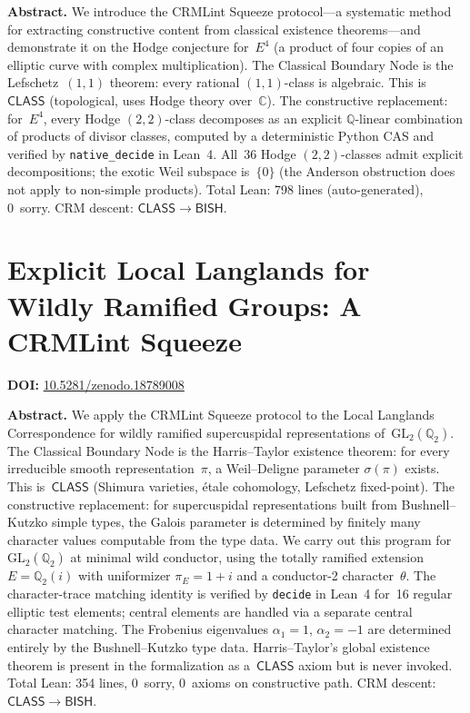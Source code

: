 \documentclass[11pt,a4paper]{article}
\begin{document}
\bigskip
\noindent\textbf{Abstract.}
We introduce the CRMLint Squeeze protocol---a systematic method for extracting constructive content from classical existence theorems---and demonstrate it on the Hodge conjecture for~$E^4$ (a product of four copies of an elliptic curve with complex multiplication). The Classical Boundary Node is the Lefschetz~$(1,1)$ theorem: every rational $(1,1)$-class is algebraic. This is~$\mathsf{CLASS}$ (topological, uses Hodge theory over~$\mathbb{C}$). The constructive replacement: for~$E^4$, every Hodge $(2,2)$-class decomposes as an explicit $\mathbb{Q}$-linear combination of products of divisor classes, computed by a deterministic Python CAS and verified by \texttt{native\_decide} in Lean~4. All~36 Hodge $(2,2)$-classes admit explicit decompositions; the exotic Weil subspace is~$\{0\}$ (the Anderson obstruction does not apply to non-simple products). Total Lean: 798 lines (auto-generated), 0~sorry. CRM descent: $\mathsf{CLASS} \to \mathsf{BISH}$.

\section{Explicit Local Langlands for Wildly Ramified Groups: A CRMLint Squeeze}
\label{sec:p78}
\textbf{DOI:} \href{https://doi.org/10.5281/zenodo.18789008}{10.5281/zenodo.18789008}

\bigskip
\noindent\textbf{Abstract.}
We apply the CRMLint Squeeze protocol to the Local Langlands Correspondence for wildly ramified supercuspidal representations of~$\mathrm{GL}_2(\mathbb{Q}_2)$. The Classical Boundary Node is the Harris--Taylor existence theorem: for every irreducible smooth representation~$\pi$, a Weil--Deligne parameter $\sigma(\pi)$ exists. This is~$\mathsf{CLASS}$ (Shimura varieties, \'etale cohomology, Lefschetz fixed-point). The constructive replacement: for supercuspidal representations built from Bushnell--Kutzko simple types, the Galois parameter is determined by finitely many character values computable from the type data. We carry out this program for~$\mathrm{GL}_2(\mathbb{Q}_2)$ at minimal wild conductor, using the totally ramified extension $E = \mathbb{Q}_2(i)$ with uniformizer $\pi_E = 1+i$ and a conductor-2 character~$\theta$. The character-trace matching identity is verified by \texttt{decide} in Lean~4 for~16 regular elliptic test elements; central elements are handled via a separate central character matching. The Frobenius eigenvalues $\alpha_1 = 1$, $\alpha_2 = -1$ are determined entirely by the Bushnell--Kutzko type data. Harris--Taylor's global existence theorem is present in the formalization as a~$\mathsf{CLASS}$ axiom but is never invoked. Total Lean: 354 lines, 0~sorry, 0~axioms on constructive path. CRM descent: $\mathsf{CLASS} \to \mathsf{BISH}$.
\end{document}
